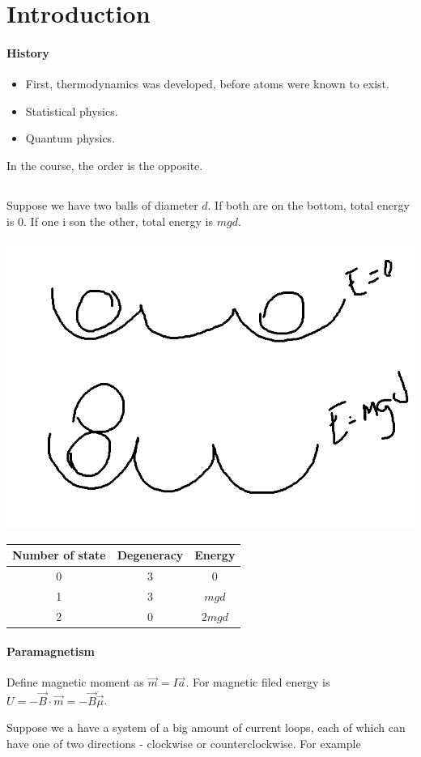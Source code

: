 \section{Introduction}
\paragraph{History}
\begin{itemize}
	\item First, thermodynamics was developed, before atoms were known to exist.
	\item Statistical physics.
	\item Quantum physics. 
\end{itemize}
In the course, the order is the opposite.
\subsection{}
Suppose we have two balls of diameter $d$. If both are on the bottom, total energy is 0. If one i son the other, total energy is $mgd$.

\begin{center}
	\includegraphics[width=0.5\linewidth]{./lect1/pic1.png}
	
	\begin{tabular}{c|c|c}
		Number of state & Degeneracy & Energy \\\hline
		0 & 3 & 0 \\
		1 & 3 & $mgd$ \\
		2 & 0 & $2mgd$ \\
	\end{tabular}
\end{center}
\paragraph{Paramagnetism}
Define magnetic moment as $\vec{m} = I \vec{a}$.
For magnetic filed energy is $U = -\vec{B} \cdot \vec{m} = - \vec{B} \dot \vec{\mu}$.

Suppose we a have a system of a big amount of current loops, each of which can have one of two directions - clockwise or counterclockwise. For example

